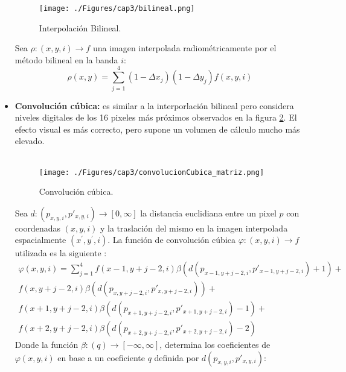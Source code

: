 \begin{itemize}
		\begin{figure}[H]
			\centering
			\texttt{[image: ./Figures/cap3/bilineal.png]}
			\caption{Interpolaci\'on Bilineal.}
			\label{fig:bilineal2}
		\end{figure}
		Sea $ \rho:(x,y,i) \longrightarrow f$ una imagen interpolada radiom\'etricamente por el m\'etodo bilineal en la banda $ i $:
		\begin{equation}
		\rho(x,y) = \sum_{j=1}^{4}(1-\Delta x_{j})(1-\Delta y_{j})f(x,y,i)
		\end{equation}	
		    		\item \textbf{Convoluci\'on c\'ubica:} es similar a la interporlaci\'on bilineal pero considera niveles digitales de los 16 pixeles m\'as pr\'oximos observados en la figura \ref{fig:convCubica2}. El efecto visual es m\'as correcto, pero supone un volumen de c\'alculo mucho m\'as elevado. \\~\\
		    				    \begin{figure}[H]
		    				    	\centering
		    				    	\texttt{[image: ./Figures/cap3/convolucionCubica\_matriz.png]}
		    				    	\caption{Convoluci\'on c\'ubica.}
		    				    	\label{fig:convCubica2}
		    				    \end{figure}
					Sea $ d:(p_{x,y,i},p'_{x,y,i})\longrightarrow [0,\infty] $ la distancia euclidiana entre un pixel $ p $ con coordenadas $ (x,y,i) $ y la traslaci\'on del mismo en la imagen interpolada espacialmente $ (x^{'},y^{'},i)$. La funci\'on de convoluci\'on c\'ubica $ \varphi:(x,y,i) \longrightarrow f$ utilizada es la siguiente \cite{guide1999erdas}:
										\begin{align}
										\varphi(x,y,i) = \sum_{j=1}^{4} f(x-1,y+j-2,i)\beta(d(p_{x-1,y+j-2,i},p'_{x-1,y+j-2,i})+1)+ \nonumber \\
										f(x,y+j-2,i)\beta(d(p_{x,y+j-2,i},p'_{x,y+j-2,i}))+ \nonumber \\
										f(x+1,y+j-2,i)\beta(d(p_{x+1,y+j-2,i},p'_{x+1,y+j-2,i})-1)+ \nonumber \\
										f(x+2,y+j-2,i)\beta(d(p_{x+2,y+j-2,i},p'_{x+2,y+j-2,i})-2)
										\end{align}
					Donde la funci\'on $ \beta:(q) \longrightarrow [-\infty,\infty] $, determina los coeficientes de $ \varphi(x,y,i) $ en base a un coeficiente $ q $ definida por $ d(p_{x,y,i},p'_{x,y,i}) $:

\end{itemize}
